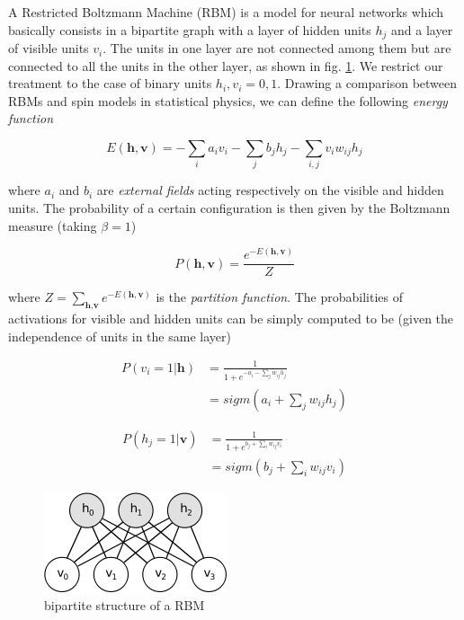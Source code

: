 \documentclass{revtex4-1}
\begin{document}
A Restricted Boltzmann Machine (RBM) is a model for neural networks which basically consists in a bipartite graph with a layer of hidden units \(h_j\) and a layer of visible units \(v_i\). The units in one layer are not connected among them but are connected to all the units in the other layer, as shown in fig. \ref{fig:rbm}. We restrict our treatment to the case of binary units \(h_i,v_i = 0,1\). Drawing a comparison between RBMs and spin models in statistical physics, we can define the following \textit{energy function}

\begin{equation}
E(\textbf{h},\textbf{v}) = - \sum_i a_i v_i - \sum_j b_j h_j - \sum_{i,j} v_i w_{ij} h_j
\label{eq:ef}
\end{equation}

where \(a_i\) and \(b_i\) are \textit{external fields} acting respectively on the visible and hidden units. The probability of a certain configuration is then given by the Boltzmann measure (taking \(\beta = 1\))

\begin{equation}
P(\textbf{h},\textbf{v}) = \frac{e^{-E(\textbf{h},\textbf{v})}}{Z}
\end{equation}

where \( \textstyle Z = \sum_{\textbf{h},\textbf{v}} e^{-E(\textbf{h},\textbf{v})}\) is the \textit{partition function}. The probabilities of activations for visible and hidden units can be simply computed to be (given the independence of units in the same layer)

\begin{align}
P(v_i = 1 | \textbf{h}) &  = \frac{1}{1+e^{-a_i - \sum_{j} w_{ij} h_j}} \nonumber \\
& = sigm \left(a_i + \sum_{j} w_{ij} h_j \right)
\label{eq:act_vis}
\end{align}

\begin{align}
P(h_j = 1 | \textbf{v}) & = \frac{1}{1+e^{b_j + \sum_i w_{ij} v_i}} \nonumber \\
& = sigm \left(b_j + \sum_i w_{ij} v_i \right)
\label{eq:act_hid}
\end{align}

\begin{figure}
  \centering
  \includegraphics{rbm.png}
  \caption{bipartite structure of a RBM}
  \label{fig:rbm}
\end{figure}
\end{document}
